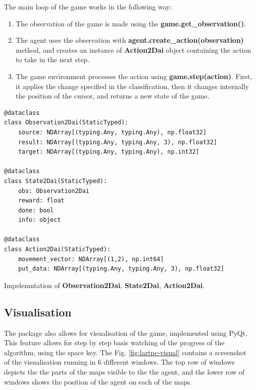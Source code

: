 The main loop of the game works in the following way:

\begin{enumerate}
    \item The observation of the game is made using the \textbf{game.get\_observation()}.
  \item The agent uses the observation with \textbf{agent.create\_action(observation)} method, and creates an instance of \textbf{Action2Dai} object containing the action to take in the next step.
  \item The game environment processes the action using \textbf{game.step(action)}. First, it applies the change specified in the classification, then it changes internally the position of the cursor, and returns a new state of the game.
\end{enumerate}


\begin{listing}[!ht]
\begin{verbatim}
@dataclass
class Observation2Dai(StaticTyped):
    source: NDArray[(typing.Any, typing.Any), np.float32]
    result: NDArray[(typing.Any, typing.Any, 3), np.float32]
    target: NDArray[(typing.Any, typing.Any), np.int32]

@dataclass
class State2Dai(StaticTyped):
    obs: Observation2Dai
    reward: float
    done: bool
    info: object

@dataclass
class Action2Dai(StaticTyped):
    movement_vector: NDArray[(1,2), np.int64]
    put_data: NDArray[(typing.Any, typing.Any, 3), np.float32]
\end{verbatim}
\caption{Impelemntation of \textbf{Observation2Dai}, \textbf{State2Dai}, \textbf{Action2Dai}.}
\label{listing:rl_observables}
\end{listing}

\subsection{Visualisation}

The package also allows for visualisation of the game, implemented using PyQt.
This feature allows for step by step basis watching of the progress of the algorithm, using the space key.
The Fig. \ref{fig:lartpc-visual} contains a screenshot of the visualisation running in 6 different windows.
The top row of windows depicts the the parts of the maps visible to the the agent, and the lower row of windows shows the position of the agent on each of the maps.

